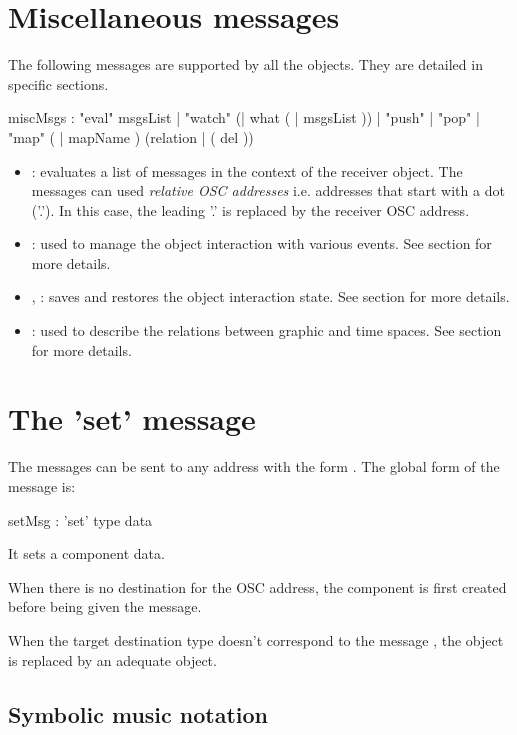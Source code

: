 \documentclass[a4paper,twoside]{report}
\newcommand{\toplevel}[1]	{\chapter{#1}}
\newcommand{\sublevel}[1]	{\section{#1}}
\begin{document}
\toplevel{Miscellaneous messages}
\label{miscmsgs}

The following messages are supported by all the objects. They are detailed in specific sections.


\begin{rail}
miscMsgs :  
		 	"eval" msgsList
		|   "watch" (| what ( | msgsList ))
		| 	"push"
		| 	"pop"
		| 	"map" ( | mapName ) (relation | ( del ))
\end{rail}

\begin{itemize}
\item {}: evaluates a list of messages in the context of the receiver object. The messages can used \emph{relative OSC addresses} i.e. addresses that start with a dot ('.'). In this case, the leading '.' is replaced by the receiver OSC address.
\item {}: used to manage the object interaction with various events. See section  for more details.
\item {}, : saves and restores the object interaction state. See section  for more details.
\item {}: used to describe the relations between graphic and time spaces. See section  for more details.
\end{itemize}



\toplevel{The 'set' message}
\label{setsect}
The  messages can be sent to any address with the form . The global form of the message is:

\begin{rail}
setMsg : 'set' type data
\end{rail}

It sets a  component data. 

When there is no destination for the OSC address, the component is first created before being given the message. 

When the target destination type doesn't correspond to the message , the object is replaced by an adequate object.

\sublevel{Symbolic music notation}
\label{symscore}
\end{document}
